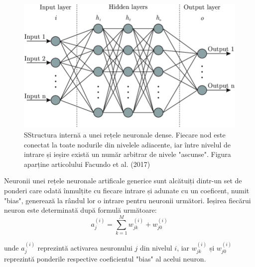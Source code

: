 \documentclass[a4paper,12pt]{book}
\begin{document}
			\begin{figure}[t]
			\centering
			\includegraphics[scale=0.50]{nns}
			\caption{SStructura internă a unei rețele neuronale dense. Fiecare nod este conectat la toate nodurile din nivelele adiacente, iar între nivelul de intrare și ieșire există un număr arbitrar de nivele "ascunse". Figura aparține articolului Facundo et al. (2017) \cite{nnspic}}
			\label{fig:nns}
			\end{figure}	
			
			Neuronii unei rețele neuronale artificale generice sunt alcătuiți dintr-un set de ponderi care odată înmulțite cu fiecare intrare și adunate cu un coeficent, numit "bias", generează la rândul lor o intrare pentru neuronii următori. 
			\noindent Ieșirea fiecărui neuron este determinată după formulă următoare:
			\begin{equation}
					a_j^{(i)} = \sum_{k=1}^{M} w_{jk}^{(i)} + w_{j0}^{(i)}
			\end{equation}
			
			unde $a_j^{(i)}$ reprezintă activarea neuronului $j$ din nivelul $i$, iar $w_{jk}^{(i)}$ și $w_{j0}^{(i)}$ reprezintă ponderile respective coeficientul "bias" al acelui neuron. \par
			
\end{document}
